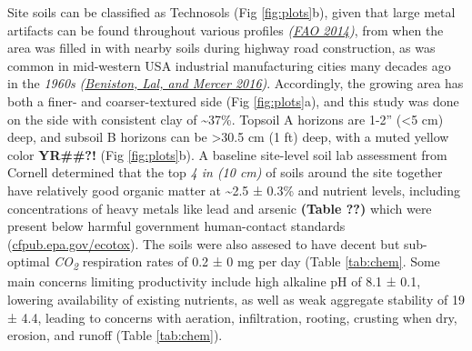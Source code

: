\documentclass[
  12pt,
]{article}
\begin{document}
Site soils can be classified as Technosols (Fig \ref{fig:plots}b), given that large metal artifacts can be found throughout various profiles \emph{(\protect\hyperlink{ref-fao14}{FAO 2014})}, from when the area was filled in with nearby soils during highway road construction, as was common in mid-western USA industrial manufacturing cities many decades ago in the \emph{1960s} \emph{(\protect\hyperlink{ref-beniston16}{Beniston, Lal, and Mercer 2016})}.
Accordingly, the growing area has both a finer- and coarser-textured side (Fig \ref{fig:plots}a),
and this study was done on the side with consistent clay of \textasciitilde37\%.
Topsoil A horizons are 1-2'' (\textless5 cm) deep, and subsoil B horizons can be \textgreater30.5 cm (1 ft) deep, with a muted yellow color \textbf{YR\#\#?!} (Fig \ref{fig:plots}b).
A baseline site-level soil lab assessment from Cornell determined that the top \emph{4 in (10 cm)} of soils around the site together have relatively good organic matter at
\textasciitilde2.5 ±
0.3\%
and nutrient levels, including concentrations of heavy metals like lead and arsenic \textbf{(Table ??)} which were present below harmful government human-contact standards (\url{cfpub.epa.gov/ecotox}).
The soils were also assesed to have decent but sub-optimal \emph{CO\textsubscript{2}} respiration rates of
0.2 ±
0 mg per day
(Table \ref{tab:chem}.
Some main concerns limiting productivity include high alkaline pH of
8.1 ±
0.1,
lowering availability of existing nutrients, as well as weak aggregate stability of
19 ±
4.4,
leading to concerns with aeration, infiltration, rooting, crusting when dry, erosion, and runoff (Table \ref{tab:chem}).
\end{document}

